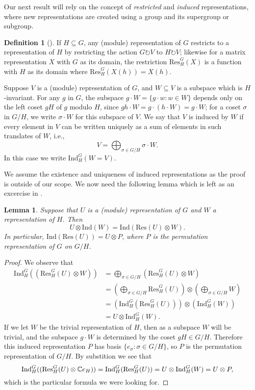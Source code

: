 \documentclass[12pt,twoside]{reedthesis}
\theoremstyle{plain}   %
\newtheorem{lemma}{Lemma}[section]
\theoremstyle{definition}
\newtheorem{defn}{Definition}[section]
\theoremstyle{remark}
\numberwithin{equation}{section}
\def\ind{\mathrm{Ind}}
\def\res{\mathrm{Res}}
\def\acts{\circlearrowright} %
\begin{document}
  Our next result will rely on the concept of \emph{restricted} and \emph{induced} representations, where new representations are created using a group and its supergroup or subgroup.
  \begin{defn}[{\cite[Section 3.3]{fulton2004}}]
    If $H \subseteq G$, any (module) representation of $G$ restricts to a representation of $H$ by restricting the action $G \acts V$ to $H \acts V$; likewise for a matrix representation $X$ with $G$ as its domain,
    the restriction $\res_H^G (X)$ is a function with $H$ as its domain where $\res_H^G(X(h)) = X(h)$.
    \par
    Suppose $V$ is a (module) representation of $G$, and $W \subseteq V$ is a subspace which is $H$-invariant.
    For any $g$ in $G$, the subspace $g \cdot W = \{ g \cdot w: w \in W\}$ depends only on the left coset $gH$ of $g$ modulo $H$, since $gh \cdot W = g \cdot (h \cdot W) = g \cdot W$;
    for a coset $\sigma$ in $G/H$, we write $\sigma \cdot W$ for this subspace of $V$. We say that $V$ is induced by $W$ if every element in $V$ can be written uniquely as a sum of elements in such translates of $W$, i.e.,
    \[ V = \bigoplus_{\sigma \in G/H} \sigma \cdot W.\]
    In this case we write $\ind^G_H (W = V)$.
  \end{defn}
  We assume the existence and uniqueness of induced representations as the proof is outside of our scope.
  We now need the following lemma which is left as an excercise in \cite[Excercise 3.16]{fulton2004}.
  \begin{lemma}
    Suppose that $U$ is a (module) representation of $G$ and $W$ a representation of $H$. Then
    \[ U \otimes \ind (W) = \ind( \res (U) \otimes W).\]
    In particular, $\ind ( \res (U)) = U \otimes P$, where $P$ is the permutation representation of $G$ on $G/H$.
  \end{lemma}
  \begin{proof}
    We observe that
    \begin{align*}
      \ind^G_H ((\res^G_H(U) \otimes W)) &= \bigoplus_{\sigma \in G/H} ( \res^G_H(U) \otimes W) \\
                                       &= (\bigoplus_{\sigma \in G/H}  \res^G_H(U)) \otimes (\bigoplus_{\sigma \in G/H} W) \\
                                       &= ( \ind^G_H (\res^G_H(U))) \otimes ( \ind^G_H ( W)) \\
                                       &= U \otimes \ind^G_H (W).
    \end{align*}
    If we let $W$ be the trivial representation of $H$, then as a subspace $W$ will be trivial, and the subspace $g \cdot W$ is determined by the coset $gH \in G/H$. Therefore
    this induced representation $P$ has basis $\{e_\sigma : \sigma \in G/H\}$,
    so $P$ is the permutation representation of $G/H$.
    By substition we see that
    \[ \ind^G_H ((\res^G_H(U) \otimes \CC e_H)) =  \ind^G_H (\res^G_H(U)) = U \otimes \ind^G_H (W) = U \otimes P,\]
    which is the particular formula we were looking for.
  \end{proof}
\end{document}
